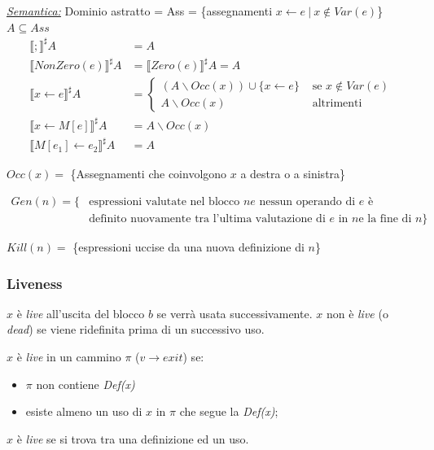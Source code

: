 \documentclass{article}
\begin{document}
                    \noindent
                    \underline{\textit{Semantica:}}
                    Dominio astratto = Ass = \{assegnamenti $x\leftarrow e ~|~ x\notin Var(e)$\}
                    $A\subseteq Ass$
                    \begin{align*}
                        \llbracket ; \rrbracket^\sharp A &= A\\
                        \llbracket NonZero(e) \rrbracket^\sharp A &= \llbracket Zero(e) \rrbracket^\sharp A = A\\
                        \llbracket x\leftarrow e \rrbracket^\sharp A &= \begin{cases}
                            (A\backslash Occ(x)) \cup \{x\leftarrow e \} &\text{ se } x\notin Var(e) \\
                            A\backslash Occ(x) &\text{ altrimenti}
                        \end{cases}\\
                        \llbracket x\leftarrow M[e] \rrbracket^\sharp A &= A\backslash Occ(x)\\
                        \llbracket M[e_1]\leftarrow e_2 \rrbracket^\sharp A &= A
                    \end{align*}

                    $Occ(x) = $ \{Assegnamenti che coinvolgono $x$ a destra o a sinistra\}

                    $ \begin{aligned}
                        Gen(n) = \{ &\text{espressioni valutate nel blocco } n e \text{ nessun operando di } e \text{ è}\\
                        &\text{definito nuovamente tra l'ultima valutazione di } e \text{ in } n \text{e la fine di } n \}
                    \end{aligned} $

                    $Kill(n) = $ \{espressioni uccise da una nuova definizione di $n$\}

                \subsubsection{Liveness}
                $x$ è \textit{live} all'uscita del blocco $b$ se verrà usata successivamente. $x$ non è \textit{live} (o \textit{dead}) se viene ridefinita prima di un successivo uso.

                \noindent
                $x$ è \textit{live} in un cammino $\pi$ ($v\rightarrow exit$) se:
                \begin{itemize}
                    \item $\pi$ non contiene \textit{Def(x)}
                    \item esiste almeno un uso di $x$ in $\pi$ che segue la \textit{Def(x)};
                \end{itemize}
                \noindent
                $x$ è \textit{live} se si trova tra una definizione ed un uso.
\end{document}
